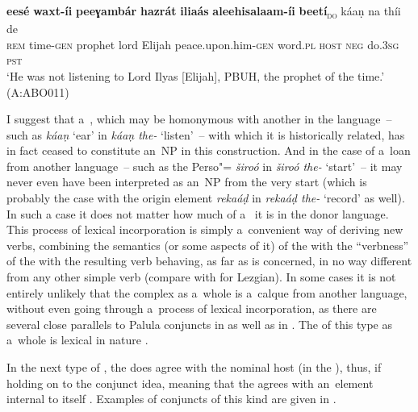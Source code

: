\begin{exe}
\ea
\label{ex:12-76}
\gll {\ob}\textbf{eesé} \textbf{waxt-íi} \textbf{peeɣambár} \textbf{hazrát} \textbf{iliaás} \textbf{aleehisalaam-íi} \textbf{ beetí}{\cb}\textsubscript{\textsc{\upshape do}} káaṇ na thíi de\\
\textsc{rem} time-\textsc{gen} prophet lord Elijah peace.upon.him-\textsc{gen} word.\textsc{pl} \textsc{host} \textsc{neg} do.\textsc{3sg} \textsc{pst}\\
\glt `He was not listening to Lord Ilyas [Elijah], PBUH, the prophet of the time.' (A:ABO011)
\z

I suggest that a~, which may be homonymous with another  in the language~-- such as \textit{káaṇ} `ear' in \textit{káaṇ the-} `listen'~-- with which it is historically related, has in fact ceased to constitute an~NP in this construction. And in the case of a~loan from another language~-- such as the Perso"=\iliArabic {} \textit{široó} in \textit{široó the-} `start'~-- it may never even have been interpreted as an~NP from the very start (which is probably the case with the \iliEnglish origin element \textit{rekaáḍ} in \textit{rekaáḍ the-} `record' as well). In such a case it does not matter how much of a~ it is in the donor language. This process of lexical incorporation \citep[203]{verma1993} is simply a~convenient way of deriving new verbs, combining the semantics (or some aspects of it) of the  with the ``verbness'' of the  with the resulting verb behaving, as far as  is concerned, in no way different from any other simple  verb (compare with \citealt[286]{haspelmath1993} for Lezgian). In some cases it is not entirely unlikely that the complex as a~whole is a~calque from another language, without even going through a~process of lexical incorporation, as there are several close parallels to Palula conjuncts in \iliUrdu as well as in \iliPashto. The  of this type as a~whole is lexical in nature \citep[199]{verma1993}.



 In the next type of , the  does agree with the nominal host (in the ), thus, if holding on to the conjunct idea, meaning that the  agrees with an~element internal to itself \citep[168]{mohanan1993}. Examples of conjuncts of this kind are given in .



\end{exe}
